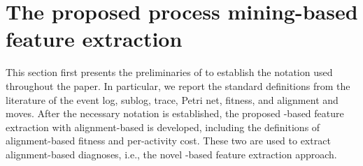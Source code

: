 \section{The proposed process mining-based feature extraction}
\label{sec:abccfe}
This section first presents the preliminaries of  to establish the notation used throughout the paper. In particular, we report the standard definitions from the  literature of the event log, sublog, trace, Petri net, fitness, and alignment and moves. After the necessary notation is established, the proposed -based feature extraction with alignment-based  is developed, including the definitions of alignment-based fitness and per-activity cost. These two are used to extract alignment-based  diagnoses, i.e., the novel -based feature extraction approach.
